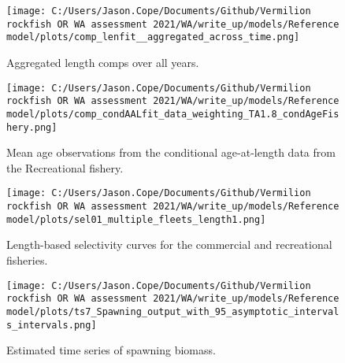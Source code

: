 \documentclass[11pt,
  english,
  a4paper,
]{article}
\begin{document}
\tagmcend\tagstructend


\begin{figure}
\centering
\texttt{[image: C:/Users/Jason.Cope/Documents/Github/Vermilion rockfish OR WA assessment 2021/WA/write\_up/models/Reference model/plots/comp\_lenfit\_\_aggregated\_across\_time.png]}
\caption{Aggregated length comps over all years.\label{fig:agg-len-fit}}
\end{figure}

\tagmcend\tagstructend


\begin{figure}
\centering
\texttt{[image: C:/Users/Jason.Cope/Documents/Github/Vermilion rockfish OR WA assessment 2021/WA/write\_up/models/Reference model/plots/comp\_condAALfit\_data\_weighting\_TA1.8\_condAgeFishery.png]}
\caption{Mean age observations from the conditional age-at-length data from the Recreational fishery.\label{fig:rec-mean-caal}}
\end{figure}

\tagmcend\tagstructend


\begin{figure}
\centering
\texttt{[image: C:/Users/Jason.Cope/Documents/Github/Vermilion rockfish OR WA assessment 2021/WA/write\_up/models/Reference model/plots/sel01\_multiple\_fleets\_length1.png]}
\caption{Length-based selectivity curves for the commercial and recreational fisheries.\label{fig:fleet_selectivity}}
\end{figure}

\tagmcend\tagstructend


\begin{figure}
\centering
\texttt{[image: C:/Users/Jason.Cope/Documents/Github/Vermilion rockfish OR WA assessment 2021/WA/write\_up/models/Reference model/plots/ts7\_Spawning\_output\_with\_95\_asymptotic\_intervals\_intervals.png]}
\caption{Estimated time series of spawning biomass.\label{fig:ssb}}
\end{figure}
\end{document}
